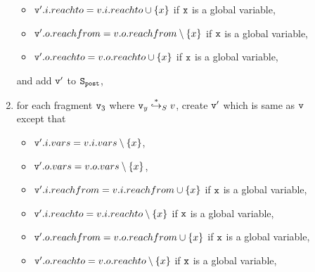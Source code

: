 \begin{description}
\begin{enumerate}
\begin{itemize}
\item $\mathtt{v}'.i.reachto = v.i.reachto \cup \{x\}$ if $\tt x$ is a global variable,
\item $\mathtt{v}'.o.reachfrom = v.o.reachfrom \setminus \{x\}$ if $\tt x$ is a global variable,
\item $\mathtt{v}'.o.reachto = v.o.reachto \cup \{x\}$ if $\tt x$ is a global variable,
\end{itemize}
and add $\mathtt{v}'$ to $\tt S_{post}$,
\item for each fragment $\mathtt{v}_3$ where $\mathtt{v}_y \overset{*}\hookrightarrow_S v$, create $\mathtt{v}'$ which is same as $\mathtt{v}$ except that
\begin{itemize}
\item $\mathtt{v}'.i.vars = v.i.vars \setminus \{x\}$,
\item $\mathtt{v}'.o.vars = v.o.vars \setminus \{x\}$,
\item $\mathtt{v}'.i.reachfrom = v.i.reachfrom \cup \{x\}$ if $\tt x$ is a global variable,
\item $\mathtt{v}'.i.reachto = v.i.reachto \setminus \{x\}$ if $\tt x$ is a global variable,

 \item $\mathtt{v}'.o.reachfrom = v.o.reachfrom \cup \{x\}$ if $\tt x$ is a global variable,
 \item $\mathtt{v}'.o.reachto = v.o.reachto \setminus \{x\}$ if $\tt x$ is a global variable,


\end{itemize}
\end{enumerate}
\end{description}
